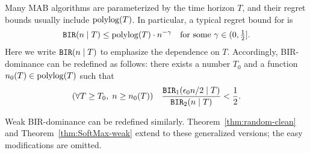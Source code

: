 Many MAB algorithms are parameterized by the time horizon $T$, and their regret bounds usually include $\polylog(T)$. In particular,  a typical regret bound for \BIR is
\begin{align}
    \BIR(n\mid T)\leq \polylog(T)\cdot n^{-\gamma}
    \quad \text{for some $\gamma\in(0,\tfrac12]$}.
\end{align}
Here we write $\mathtt{BIR}(n\mid T)$ to emphasize the dependence on $T$. Accordingly, BIR-dominance can be redefined as follows: there exists a number $T_0$ and a function $n_0(T)\in \polylog(T)$
such that
\begin{align}\label{eq:random-better-messy}
(\forall T\geq T_0,\; n\geq n_0(T)) \quad
\frac{\mathtt{BIR}_1(\epsilon_0 n /2\mid T)}{\mathtt{BIR}_2(n\mid T)} <\frac12.
\end{align}

\noindent Weak BIR-dominance can be redefined similarly.
Theorem~\ref{thm:random-clean} and Theorem~\ref{thm:SoftMax-weak} extend to these generalized versions; the easy modifications are omitted.







